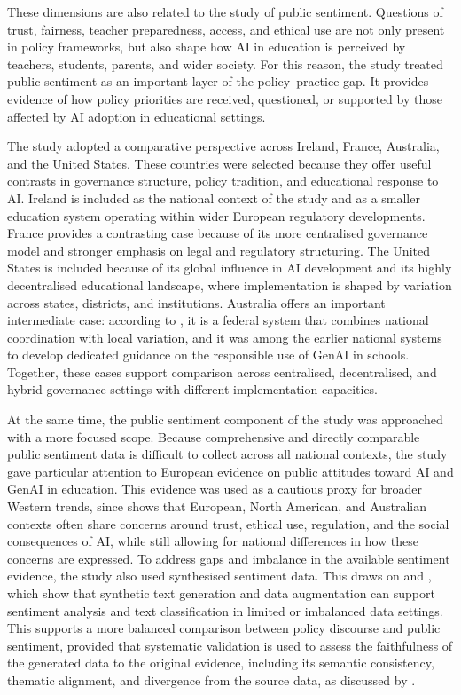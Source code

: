 These dimensions are also related to the study of public sentiment. Questions of
trust, fairness, teacher preparedness, access, and ethical use are not only present
in policy frameworks, but also shape how AI in education is perceived by teachers,
students, parents, and wider society. For this reason, the study treated public
sentiment as an important layer of the policy--practice gap. It provides evidence of
how policy priorities are received, questioned, or supported by those affected by AI
adoption in educational settings.

The study adopted a comparative perspective across Ireland, France, Australia, and
the United States. These countries were selected because they offer useful contrasts
in governance structure, policy tradition, and educational response to AI. Ireland is
included as the national context of the study and as a smaller education system
operating within wider European regulatory developments. France provides a
contrasting case because of its more centralised governance model and stronger
emphasis on legal and regulatory structuring. The United States is included because
of its global influence in AI development and its highly decentralised educational
landscape, where implementation is shaped by variation across states, districts, and
institutions. Australia offers an important intermediate case: according to
\cite{australianframeworkgenai2023}, it is a federal system that combines national
coordination with local variation, and it was among the earlier national systems to
develop dedicated guidance on the responsible use of GenAI in schools. Together,
these cases support comparison across centralised, decentralised, and hybrid
governance settings with different implementation capacities.


At the same time, the public sentiment component of the study was approached with a
more focused scope. Because comprehensive and directly comparable public sentiment
data is difficult to collect across all national contexts, the study gave particular
attention to European evidence on public attitudes toward AI and GenAI in education.
This evidence was used as a cautious proxy for broader Western trends, since
\cite{pew2025globalai} shows that European, North American, and Australian contexts
often share concerns around trust, ethical use, regulation, and the social
consequences of AI, while still allowing for national differences in how these
concerns are expressed. To address gaps and imbalance in the available sentiment
evidence, the study also used synthesised sentiment data. This draws on
\cite{imran2022impact} and \cite{bayer2022survey}, which show that synthetic text
generation and data augmentation can support sentiment analysis and text
classification in limited or imbalanced data settings. This supports a more balanced
comparison between policy discourse and public sentiment, provided that systematic
validation is used to assess the faithfulness of the generated data to the original
evidence, including its semantic consistency, thematic alignment, and divergence from
the source data, as discussed by \cite{chim2025evaluating}.

